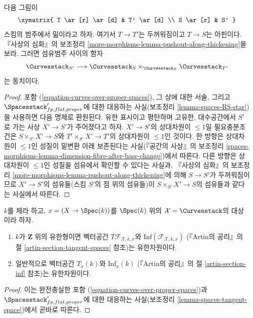 \begin{lemma}
\label{lemma-curves-RS-star}
다음 그림이
$$
\xymatrix{
T \ar[r] \ar[d] & T' \ar[d] \\
S \ar[r] & S'
}
$$
스킴의 범주에서 밂이라고 하자. 여기서 $T \to T'$는 두꺼워짐이고
$T \to S$는 아핀이다. 『사상의 심화』의 보조정리
\ref{more-morphisms-lemma-pushout-along-thickening}을 보라. 그러면 섬유범주
사이의 함자
$$
\Curvesstack_{S'}
\longrightarrow
\Curvesstack_S
\times_{\Curvesstack_T}
\Curvesstack_{T'}
$$
는 동치이다.
\end{lemma}

\begin{proof}
포함 (\ref{equation-curves-over-proper-spaces}), 그 상에 대한 서술, 그리고
$\Spacesstack'_{fp, flat, proper}$에 대한 대응하는 사실(보조정리
\ref{lemma-spaces-RS-star})을 사용하면 다음 명제로 환원된다. 유한 표시이고
평탄하며 고유한, 대수공간에서 $S'$로 가는 사상 $X' \to S'$가 주어졌다고 하자.
$X' \to S'$의 상대차원이 $\leq 1$일 필요충분조건은
$S \times_{S'} X' \to S$와 $T' \times_{S'} X' \to T'$의 상대차원이
$\leq 1$인 것이다. 한 방향은 상대차원이 $\leq 1$인 성질이 밑변환 아래
보존된다는 사실(『공간의 사상』의 보조정리
\ref{spaces-morphisms-lemma-dimension-fibre-after-base-change})에서 따른다.
다른 방향은 상대차원이 $\leq 1$인 성질을 섬유에서 확인할 수 있다는 사실과,
『사상의 심화』의 보조정리
\ref{more-morphisms-lemma-pushout-along-thickening}에 의해 $S \to S'$가
두꺼워짐이므로 $X' \to S'$의 섬유들(스킴 $S'$의 점 위의 섬유들)이
$S \times_{S'} X' \to S$의 섬유들과 같다는 사실에서 따른다.
\end{proof}

\begin{lemma}
\label{lemma-curves-tangent-space}
$k$를 체라 하고, $x = (X \to \Spec(k))$를 $\Spec(k)$ 위의
$\mathcal{X} = \Curvesstack$의 대상이라 하자.
\begin{enumerate}
\item $k$가 $\mathbf{Z}$ 위의 유한형이면 벡터공간
$T\mathcal{F}_{\mathcal{X}, k, x}$와
$\text{Inf}(\mathcal{F}_{\mathcal{X}, k, x})$
(『Artin의 공리』의 절 \ref{artin-section-tangent-spaces} 참조)는 유한차원이다.
\item 일반적으로 벡터공간 $T_x(k)$와 $\text{Inf}_x(k)$
(『Artin의 공리』의 절 \ref{artin-section-inf} 참조)는 유한차원이다.
\end{enumerate}
\end{lemma}

\begin{proof}
이는 완전충실한 포함 (\ref{equation-curves-over-proper-spaces})과
$\Spacesstack'_{fp, flat, proper}$에 대한 대응하는 사실(보조정리
\ref{lemma-spaces-tangent-space})에서 곧바로 따른다.
\end{proof}

